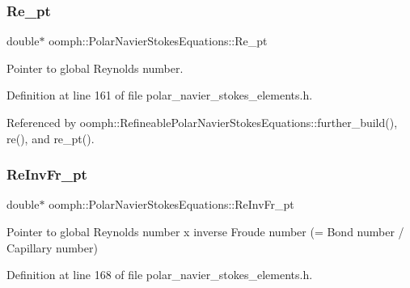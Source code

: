 \mbox{\label{classoomph_1_1PolarNavierStokesEquations_a85eeb2e2f741b04f0d81501bf44109f8}} 
\subsubsection{\texorpdfstring{Re\+\_\+pt}{Re\_pt}}
{\footnotesize\ttfamily double$\ast$ oomph\+::\+Polar\+Navier\+Stokes\+Equations\+::\+Re\+\_\+pt\hspace{0.3cm}{\ttfamily [protected]}}



Pointer to global Reynolds number. 



Definition at line 161 of file polar\+\_\+navier\+\_\+stokes\+\_\+elements.\+h.



Referenced by oomph\+::\+Refineable\+Polar\+Navier\+Stokes\+Equations\+::further\+\_\+build(), re(), and re\+\_\+pt().

\mbox{\label{classoomph_1_1PolarNavierStokesEquations_ab75185b504baf9b685fbdc7b22bec68f}} 
\subsubsection{\texorpdfstring{Re\+Inv\+Fr\+\_\+pt}{ReInvFr\_pt}}
{\footnotesize\ttfamily double$\ast$ oomph\+::\+Polar\+Navier\+Stokes\+Equations\+::\+Re\+Inv\+Fr\+\_\+pt\hspace{0.3cm}{\ttfamily [protected]}}



Pointer to global Reynolds number x inverse Froude number (= Bond number / Capillary number) 



Definition at line 168 of file polar\+\_\+navier\+\_\+stokes\+\_\+elements.\+h.



